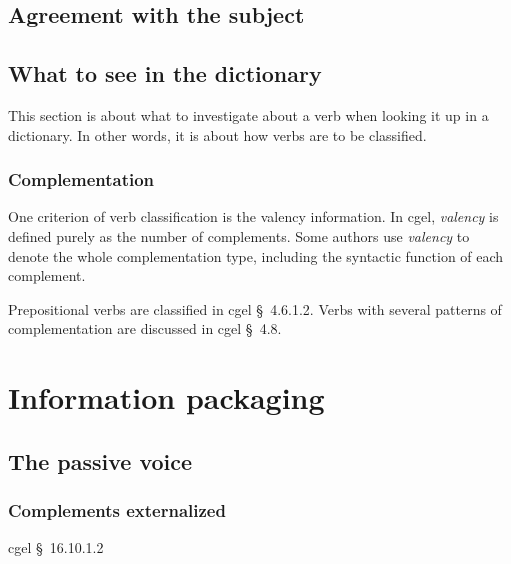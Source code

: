 \documentclass{article}
\newcommand*{\citesec}[1]{\S~{#1}}
\newcommand*{\term}[1]{\emph{#1}}
\begin{document}
\subsection{Agreement with the subject}\label{sec:verb-agreement}

\subsection{What to see in the dictionary}\label{sec:verb-dict}

This section is about what to investigate about a verb when looking it up in a dictionary.
In other words, it is about how verbs are to be classified.

\subsubsection{Complementation}\label{sec:dict-comp}

One criterion of verb classification is the valency information.
In \ac{cgel}, \term{valency} is defined purely as the number of complements.
Some authors use \term{valency} to denote the whole complementation type,
including the syntactic function of each complement.

Prepositional verbs are classified in \ac{cgel} \citesec{4.6.1.2}.
Verbs with several patterns of complementation are discussed in \ac{cgel} \citesec{4.8}.

\section{Information packaging}

\subsection{The passive voice}

\subsubsection{Complements externalized}\label{sec:externalized-passive}

\ac{cgel} \citesec{16.10.1.2}



\end{document}
